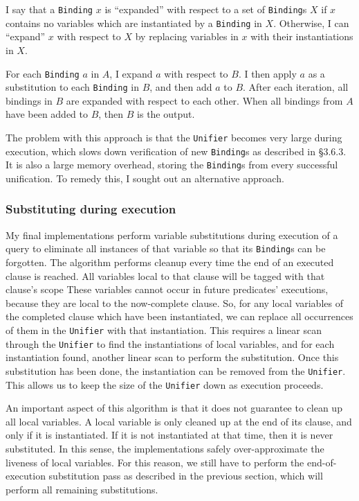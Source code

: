 \documentclass[12pt]{article}
\begin{document}
I say that a \verb|Binding| $x$ is ``expanded'' with respect to a set of \verb|Binding|s $X$ if $x$ contains no variables which are instantiated by a \verb|Binding| in $X$. 
Otherwise, I can ``expand'' $x$ with respect to $X$ by replacing variables in $x$ with their instantiations in $X$.

For each \verb|Binding| $a$ in $A$, I expand $a$ with respect to $B$. 
I then apply $a$ as a substitution to each \verb|Binding| in $B$, and then add $a$ to $B$. 
After each iteration, all bindings in $B$ are expanded with respect to each other. 
When all bindings from $A$ have been added to $B$, then $B$ is the output.

The problem with this approach is that the \verb|Unifier| becomes very large during execution, which slows down verification of new \verb|Binding|s as described in \S3.6.3. 
It is also a large memory overhead, storing the \verb|Binding|s from every successful unification.
To remedy this, I sought out an alternative approach.

\subsubsection{Substituting during execution}

My final implementations perform variable substitutions during execution of a query to eliminate all instances of that variable so that its \verb|Binding|s can be forgotten.
The algorithm performs cleanup every time the end of an executed clause is reached.
All variables local to that clause will be tagged with that clause's scope %
These variables cannot occur in future predicates' executions, because they are local to the now-complete clause.
So, for any local variables of the completed clause which have been instantiated, we can replace all occurrences of them in the \verb|Unifier| with that instantiation. 
This requires a linear scan through the \verb|Unifier| to find the instantiations of local variables, and for each instantiation found, another linear scan to perform the substitution.
Once this substitution has been done, the instantiation can be removed from the \verb|Unifier|.
This allows us to keep the size of the \verb|Unifier| down as execution proceeds.

An important aspect of this algorithm is that it does not guarantee to clean up all local variables.
A local variable is only cleaned up at the end of its clause, and only if it is instantiated.
If it is not instantiated at that time, then it is never substituted.
In this sense, the implementations safely over-approximate the liveness of local variables.
For this reason, we still have to perform the end-of-execution substitution pass as described in the previous section, which will perform all remaining substitutions.
\end{document}
